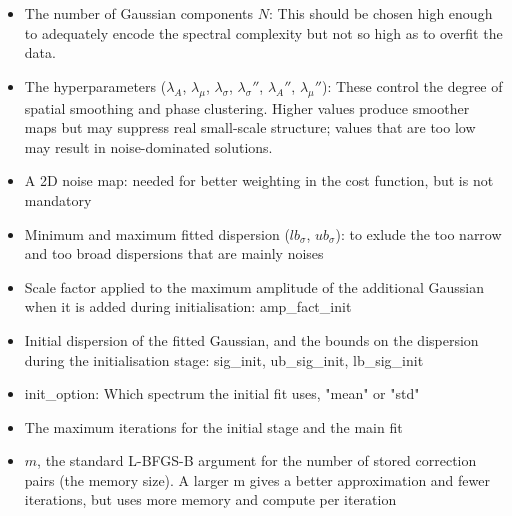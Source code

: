 \begin{itemize}
	\item The number of Gaussian components $N$: This should be chosen high enough to adequately encode the spectral complexity but not so high as to overfit the data.
	\item The hyperparameters ($\lambda_A$, $\lambda_\mu$, $\lambda_\sigma$, $\lambda_\sigma''$, $\lambda_A''$, $\lambda_\mu''$): These control the degree of spatial smoothing and phase clustering. Higher values produce smoother maps but may suppress real small-scale structure; values that are too low may result in noise-dominated solutions.
	\item A 2D noise map: needed for better weighting in the cost function, but is not mandatory
	\item Minimum and maximum fitted dispersion ($lb_\sigma$, $ub_\sigma$): to exlude the too narrow and too broad dispersions that are mainly noises
	\item Scale factor applied to the maximum amplitude of the additional Gaussian when it is added during initialisation: amp\_fact\_init 
	\item Initial dispersion of the fitted Gaussian, and the bounds on the dispersion during the initialisation stage: sig\_init, ub\_sig\_init, lb\_sig\_init
	\item init\_option: Which spectrum the initial fit uses, "mean" or "std"
	\item The maximum iterations for the initial stage and the main fit
	\item $m$, the standard L-BFGS-B argument for the number of stored correction pairs (the memory size). A larger m gives a better approximation and fewer iterations, but uses more memory and compute per iteration
\end{itemize}

